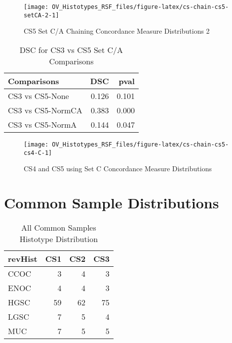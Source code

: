 \documentclass[
]{report}
\begin{document}
\begin{figure}[H]

{\centering \texttt{[image: OV\_Histotypes\_RSF\_files/figure-latex/cs-chain-cs5-setCA-2-1]} 

}

\caption{CS5 Set C/A Chaining Concordance  Measure Distributions 2}\label{fig:cs-chain-cs5-setCA-2}
\end{figure}

\begin{table}

\caption{\label{tab:cs35-CA-dsc}DSC for CS3 vs CS5 Set C/A Comparisons}
\centering
\begin{tabular}[t]{l|r|r}
\hline
Comparisons & DSC & pval\\
\hline
CS3 vs CS5-None & 0.126 & 0.101\\
\hline
CS3 vs CS5-NormCA & 0.383 & 0.000\\
\hline
CS3 vs CS5-NormA & 0.144 & 0.047\\
\hline
\end{tabular}
\end{table}

\begin{figure}[H]

{\centering \texttt{[image: OV\_Histotypes\_RSF\_files/figure-latex/cs-chain-cs5-cs4-C-1]} 

}

\caption{CS4 and CS5 using Set C Concordance Measure Distributions}\label{fig:cs-chain-cs5-cs4-C}
\end{figure}

\hypertarget{common-sample-distributions}{%
\section{Common Sample Distributions}\label{common-sample-distributions}}

\begin{table}

\caption{\label{tab:common-dist-all}All Common Samples Histotype Distribution}
\centering
\begin{tabular}[t]{l|r|r|r}
\hline
revHist & CS1 & CS2 & CS3\\
\hline
CCOC & 3 & 4 & 3\\
\hline
ENOC & 4 & 4 & 3\\
\hline
HGSC & 59 & 62 & 75\\
\hline
LGSC & 7 & 5 & 4\\
\hline
MUC & 7 & 5 & 5\\
\hline
\end{tabular}
\end{table}
\end{document}
